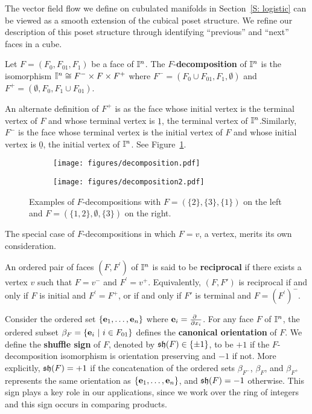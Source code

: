 The vector field flow we define on cubulated manifolds in Section~\ref{S: logistic} can be viewed as a smooth extension of the cubical poset structure.
We refine our description of this poset structure through identifying ``previous'' and ``next'' faces in a cube.

\begin{definition} \label{D: F decomposition}
	Let $F = (F_0, F_{01}, F_1)$ be a face of $\mathbb{I}^n$. The $F$-\textbf{decomposition} of $\mathbb{I}^n$ is the isomorphism $\mathbb{I}^n \cong F^- \times F \times F^+$ where $F^- = (F_0 \cup F_{01}, F_1, \emptyset)$ and $F^+ = (\emptyset, F_0, F_1 \cup F_{01})$.
\end{definition}

An alternate definition of $F^+$ is as the face whose initial vertex is the terminal vertex of $F$ and whose terminal vertex is $\underline{1}$,
the terminal vertex of $\mathbb{I}^n$.Similarly, $F^-$ is the face whose terminal vertex is the initial vertex of $F$ and whose initial vertex is $\underline{0}$, the initial vertex of $\mathbb{I}^n$. See Figure~\ref{F: decomposition}.


\begin{figure}[h!]
	\begin{subfigure}[b]{0.35\textwidth}
		\centering
		\texttt{[image: figures/decomposition.pdf]}
	\end{subfigure}
	\begin{subfigure}[b]{0.35\textwidth}
		\centering
		\texttt{[image: figures/decomposition2.pdf]}
	\end{subfigure}
	\caption{Examples of $F$-decompositions with $F = (\{2\}, \{3\}, \{1\})$ on the left and $F = (\{1,2\}, \emptyset, \{3\})$ on the right.}
	\label{F: decomposition}
\end{figure}

The special case of $F$-decompositions in which $F = v$, a vertex, merits its own consideration.

\begin{definition}\label{D: reciprocal}
	An ordered pair of faces $(F,F^\prime)$ of $\mathbb{I}^n$ is said to be \textbf{reciprocal} if there exists a vertex $v$ such that $F = v^-$ and $F^\prime = v^+$. Equivalently, $(F, F')$ is reciprocal if and only if $F$ is initial and $F^\prime = F^+$, or if and only if $F'$ is terminal and $F = (F^{\prime})^-$.
\end{definition}

Consider the ordered set $\{\mathbf{e}_1, \dots, \mathbf{e}_n\}$ where $\e_i = \frac{\partial\ }{\partial x_i}$.
For any face $F$ of $\mathbb{I}^n$, the ordered subset $\beta_F = \{\mathbf{e}_i\ |\ i \in F_{01}\}$ defines the \textbf{canonical orientation} of $F$.
We define the \textbf{shuffle sign} of $F$, denoted by $\mathfrak{sh}(F) \in \{\pm 1\}$, to be $+1$ if the $F$-decomposition isomorphism is orientation preserving and $-1$ if not.
More explicitly, $\mathfrak{sh}(F) = +1$ if the concatenation of the ordered sets $\beta_{F^-}$, $\beta_{F}$, and $\beta_{F^+}$ represents the same orientation as $\{\mathbf{e}_1, \dots, \mathbf{e}_n\}$, and $\mathfrak{sh}(F) = -1$ otherwise.
This sign plays a key role in our applications, since we work over the ring of integers and this sign occurs in comparing products.

